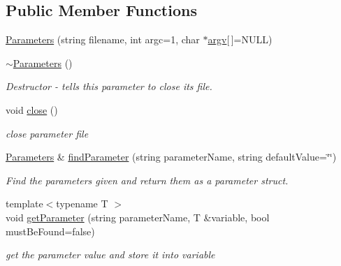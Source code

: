\subsection*{Public Member Functions}
\begin{DoxyCompactItemize}
\item 
\hyperlink{class_parameters_acf8511357f87cce3c5a31cdd4c971b19}{Parameters} (string filename, int argc=1, char $\ast$\hyperlink{class_parameters_a87ff08a93065e5d266f31b5238faf95b}{argv}\mbox{[}$\,$\mbox{]}=N\+U\+L\+L)
\item 
\hypertarget{class_parameters_a640a1a349975a8cb023696f25e563a5c}{}\hyperlink{class_parameters_a640a1a349975a8cb023696f25e563a5c}{$\sim$\+Parameters} ()\label{class_parameters_a640a1a349975a8cb023696f25e563a5c}

\begin{DoxyCompactList}\small\item\em Destructor -\/ tells this parameter to close its file. \end{DoxyCompactList}\item 
\hypertarget{class_parameters_a62ef757722bbaecc24642b2c20d7d3bb}{}void \hyperlink{class_parameters_a62ef757722bbaecc24642b2c20d7d3bb}{close} ()\label{class_parameters_a62ef757722bbaecc24642b2c20d7d3bb}

\begin{DoxyCompactList}\small\item\em close parameter file \end{DoxyCompactList}\item 
\hyperlink{class_parameters}{Parameters} \& \hyperlink{class_parameters_a1f2204e876202ac49694dde3d4951d0a}{find\+Parameter} (string parameter\+Name, string default\+Value=\char`\"{}\char`\"{})
\begin{DoxyCompactList}\small\item\em Find the parameters given and return them as a parameter struct. \end{DoxyCompactList}\item 
{\footnotesize template$<$typename T $>$ }\\void \hyperlink{class_parameters_a8f44623c70c710b3f79fc9c12fadc6a3}{get\+Parameter} (string parameter\+Name, T \&variable, bool must\+Be\+Found=false)
\begin{DoxyCompactList}\small\item\em get the parameter value and store it into variable \end{DoxyCompactList}\end{DoxyCompactItemize}
